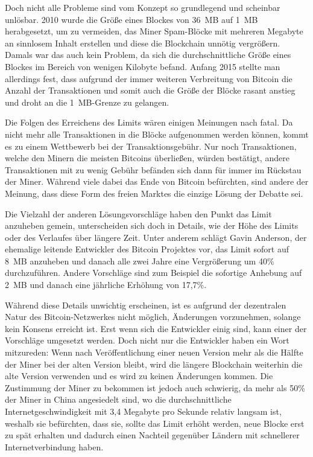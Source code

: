 Doch nicht alle Probleme sind vom Konzept so grundlegend und scheinbar unlösbar.
2010 wurde die Größe eines Blockes von 36~MB auf 1~MB herabgesetzt, um zu vermeiden, das Miner Spam-Blöcke mit mehreren Megabyte an sinnlosem Inhalt erstellen und diese die Blockchain unnötig vergrößern.
Damals war das auch kein Problem, da sich die durchschnittliche Größe eines Blockes im Bereich von wenigen Kilobyte befand.
Anfang 2015 stellte man allerdings fest, dass aufgrund der immer weiteren Verbreitung von Bitcoin die Anzahl der Transaktionen und somit auch die Größe der Blöcke rasant anstieg und droht an die 1~MB-Grenze zu gelangen.

Die Folgen des Erreichens des Limits wären einigen Meinungen nach fatal.
Da nicht mehr alle Transaktionen in die Blöcke aufgenommen werden können, kommt es zu einem Wettbewerb bei der Transaktionsgebühr.
Nur noch Transaktionen, welche den Minern die meisten Bitcoins überließen, würden bestätigt, andere Transaktionen mit zu wenig Gebühr befänden sich dann für immer im Rückstau der Miner.
Während viele dabei das Ende von Bitcoin befürchten, sind andere der Meinung, dass diese Form des freien Marktes die einzige Lösung der Debatte sei.

Die Vielzahl der anderen Lösungsvorschläge haben den Punkt das Limit anzuheben gemein, unterscheiden sich doch in Details, wie der Höhe des Limits oder des Verlaufes über längere Zeit.
Unter anderem schlägt Gavin Anderson, der ehemalige leitende Entwickler des Bitcoin Projektes vor, das Limit sofort auf 8~MB anzuheben und danach alle zwei Jahre eine Vergrößerung um 40\% durchzuführen.
Andere Vorschläge sind zum Beispiel die sofortige Anhebung auf 2~MB und danach eine jährliche Erhöhung von 17,7\%.

Während diese Details unwichtig erscheinen, ist es aufgrund der dezentralen Natur des Bitcoin-Netzwerkes nicht möglich, Änderungen vorzunehmen, solange kein Konsens erreicht ist.
Erst wenn sich die Entwickler einig sind, kann einer der Vorschläge umgesetzt werden.
Doch nicht nur die Entwickler haben ein Wort mitzureden:
Wenn nach Veröffentlichung einer neuen Version mehr als die Hälfte der Miner bei der alten Version bleibt, wird die längere Blockchain weiterhin die alte Version verwenden und es wird zu keinen Änderungen kommen.
Die Zustimmung der Miner zu bekommen ist jedoch auch schwierig, da mehr als 50\% der Miner in China angesiedelt sind, wo die durchschnittliche Internetgeschwindigkeit mit 3,4 Megabyte pro Sekunde  relativ langsam ist, weshalb sie befürchten, dass sie, sollte das Limit erhöht werden, neue Blocke erst zu spät erhalten und dadurch einen Nachteil gegenüber Ländern mit schnellerer Internetverbindung haben.

